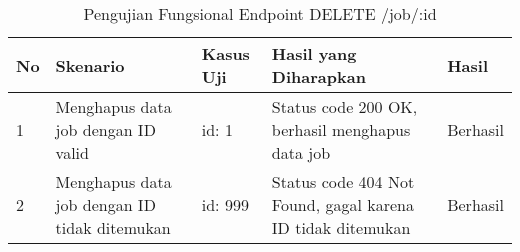 \begin{table}[H]
    \centering
    \begin{tabular}{|p{0.5cm}|p{3cm}|p{5cm}|p{5cm}|p{1.5cm}|}
        \hline
        \rowcolor[HTML]{DAE8FC} 
        \textbf{No} & \textbf{Skenario} & \textbf{Kasus Uji} & \textbf{Hasil yang Diharapkan} & \textbf{Hasil} \\ \hline
        1 & Menghapus data job dengan ID valid & 
        id: 1 & 
        Status code 200 OK, berhasil menghapus data job & 
        Berhasil \\ \hline
        2 & Menghapus data job dengan ID tidak ditemukan & 
        id: 999 & 
        Status code 404 Not Found, gagal karena ID tidak ditemukan & 
        Berhasil \\ \hline
    \end{tabular}
    \caption{Pengujian Fungsional Endpoint DELETE /job/:id}
    \label{tab:job_delete_testing}
\end{table}
